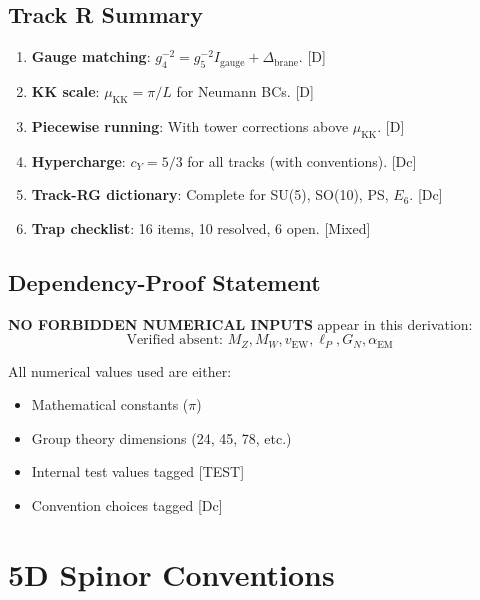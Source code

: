 \documentclass[11pt,a4paper]{article}
\begin{document}
\subsection{Track R Summary}

\begin{enumerate}
\item \textbf{Gauge matching}: $g_4^{-2} = g_5^{-2} I_{\text{gauge}} + \Delta_{\text{brane}}$. [D]
\item \textbf{KK scale}: $\mu_{\text{KK}} = \pi/L$ for Neumann BCs. [D]
\item \textbf{Piecewise running}: With tower corrections above $\mu_{\text{KK}}$. [D]
\item \textbf{Hypercharge}: $c_Y = 5/3$ for all tracks (with conventions). [Dc]
\item \textbf{Track-RG dictionary}: Complete for SU(5), SO(10), PS, $E_6$. [Dc]
\item \textbf{Trap checklist}: 16 items, 10 resolved, 6 open. [Mixed]
\end{enumerate}

\subsection{Dependency-Proof Statement}

\textbf{NO FORBIDDEN NUMERICAL INPUTS} appear in this derivation:
\begin{equation}
\text{Verified absent: } M_Z, M_W, v_{\text{EW}}, \ell_P, G_N, \alpha_{\text{EM}}
\label{eq:forbidden-final}
\end{equation}

All numerical values used are either:
\begin{itemize}
\item Mathematical constants ($\pi$)
\item Group theory dimensions (24, 45, 78, etc.)
\item Internal test values tagged [TEST]
\item Convention choices tagged [Dc]
\end{itemize}

\appendix

\section{5D Spinor Conventions}
\label{app:spinor}
\end{document}
